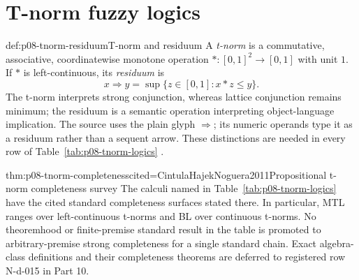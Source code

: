 \section{T-norm fuzzy logics}

\begin{hbdefinition}{def:p08-tnorm-residuum}{T-norm and residuum}
A \emph{t-norm} is a commutative, associative, coordinatewise monotone
operation \(\ast:[0,1]^2\to[0,1]\) with unit \(1\).  If \(\ast\) is
left-continuous, its \emph{residuum} is
\[
  x\Rightarrow y
  =\sup\{z\in[0,1]:x\ast z\leq y\}.
\]
The t-norm interprets strong conjunction, whereas lattice conjunction remains
minimum; the residuum is a semantic operation interpreting object-language
implication.  The source uses the plain glyph \(\Rightarrow\); its numeric
operands type it as a residuum rather than a sequent arrow.  These distinctions
are needed in every row of Table~\ref{tab:p08-tnorm-logics}
\cite{Hajek1998,CintulaHajekNoguera2011}.
\end{hbdefinition}

\begin{hbtheorem}{thm:p08-tnorm-completeness}{cited=CintulaHajekNoguera2011}{Propositional t-norm completeness survey}
The calculi named in Table~\ref{tab:p08-tnorm-logics} have the cited standard
completeness surfaces stated there.  In particular, MTL ranges over
left-continuous t-norms and BL over continuous t-norms.  No theoremhood or
finite-premise standard result in the table is promoted to arbitrary-premise
strong completeness for a single standard chain.  Exact algebra-class
definitions and their completeness theorems are deferred to registered row
N-d-015 in Part 10.
\end{hbtheorem}


